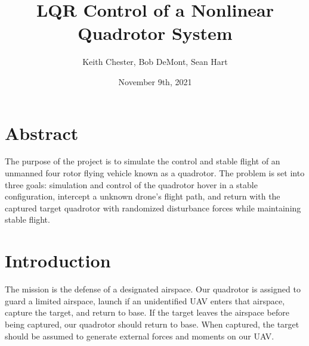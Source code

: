 \documentclass{article}
\title{LQR Control of a Nonlinear Quadrotor System}
\author{Keith Chester, Bob DeMont, Sean Hart}
\date{November 9th, 2021}
\begin{document}
\maketitle

\begin{multicols}{2}
\section*{Abstract}
The purpose of the project is to simulate the control and stable flight of an unmanned four rotor flying vehicle known as a quadrotor.  The problem is set into three goals: simulation and control of the quadrotor hover in a stable configuration, intercept a unknown drone's flight path, and return with the captured target quadrotor with randomized disturbance forces while maintaining stable flight.

\section*{Introduction}
The mission is the defense of a designated airspace.  Our quadrotor is assigned to guard a limited airspace, launch if an unidentified UAV enters that airspace, capture the target, and return to base.  If the target leaves the airspace before being captured, our quadrotor should return to base.  When captured, the target should be assumed to generate external forces and moments on our UAV.


\end{multicols}
\end{document}

